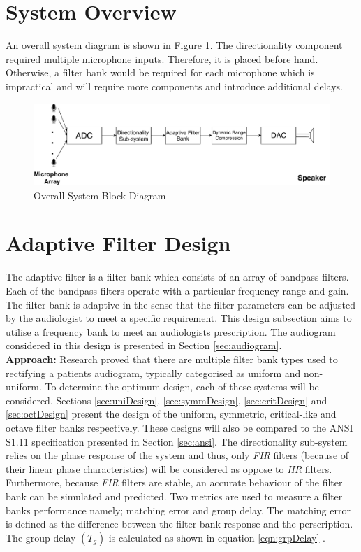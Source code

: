 \documentclass[11pt,onecolumn]{witseiepaper}
\begin{document}
\section{System Overview}

\noindent An overall system diagram is shown in Figure \ref{fig:system}. The directionality component required multiple microphone inputs. Therefore, it is placed before hand. Otherwise, a filter bank would be required for each microphone which is impractical and will require more components and introduce additional delays.

\begin{figure}[h]
\centering
\includegraphics[width=0.9\linewidth]{system.pdf}
\caption{Overall System Block Diagram}
\label{fig:system}
\end{figure}  

\section{Adaptive Filter Design}

\noindent The adaptive filter is a filter bank which consists of an array of bandpass filters. Each of the bandpass filters operate with a particular frequency range and gain. The filter bank is adaptive in the sense that the filter parameters can be adjusted by the audiologist to meet a specific requirement. This design subsection aims to utilise a frequency bank to meet an audiologists prescription.  The audiogram considered in this design is presented in Section \ref{sec:audiogram}.\\

\noindent \textbf{Approach:} Research proved that there are multiple filter bank types used to rectifying a patients audiogram, typically categorised as uniform and non-uniform. To determine the optimum design, each of these systems will be considered. Sections \ref{sec:uniDesign}, \ref{sec:symmDesign}, \ref{sec:critDesign} and \ref{sec:octDesign} present the design of the uniform, symmetric, critical-like and octave filter banks respectively. These designs will also be compared to the ANSI S1.11 specification presented in Section \ref{sec:ansi}. The directionality sub-system relies on the phase response of the system and thus, only \textit{FIR} filters (because of their linear phase characteristics) will be considered as oppose to \textit{IIR} filters. Furthermore, because \textit{FIR} filters are stable, an accurate behaviour of the filter bank can be simulated and predicted. Two metrics are used to measure a filter banks performance namely; matching error and group delay. The matching error is defined as the difference between the filter bank response and the perscription. The group delay $(T_g)$ is calculated as shown in equation \ref{eqn:grpDelay} \cite{chang}.
\end{document}
